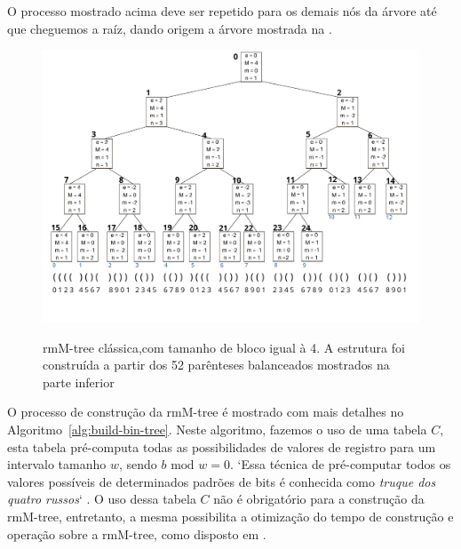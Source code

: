 \begin{example}
    O processo mostrado acima deve ser repetido para os demais nós da árvore até que cheguemos a raíz, dando origem a árvore mostrada na . 
    \begin{figure}[!ht]
     \centering
      \caption[rmM-tree clássica.]{rmM-tree clássica,com tamanho de bloco igual à 4. A estrutura foi construída a partir dos 52 parênteses balanceados mostrados na parte inferior}
      \includegraphics[width=\columnwidth]{images/rmm-tree-bin.png}
      \label{fig:rmm-tree-binaria}
    \end{figure}
\end{example}

O processo de construção da rmM-tree é mostrado com mais detalhes no Algoritmo~\ref{alg:build-bin-tree}. Neste algoritmo, fazemos o uso de uma tabela $C$, esta tabela pré-computa todas as possibilidades de valores de registro para um intervalo tamanho $w$, sendo $b \mbox{ mod } w = 0$. `Essa técnica de pré-computar todos os valores possíveis de determinados padrões de bits é conhecida como \textit{truque dos quatro russos}` \citep[tradução nossa]{book-gusfield}.
O uso dessa tabela $C$ não é obrigatório para a construção da rmM-tree, entretanto, a mesma possibilita a otimização do tempo de construção e operação sobre a rmM-tree, como disposto em \citet{book-compact-data-structures}.


